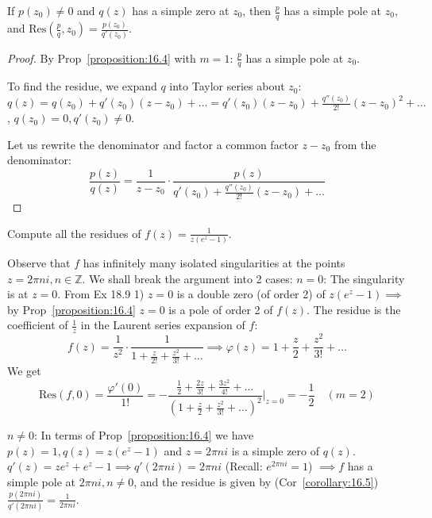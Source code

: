 \begin{corollary}\label{corollary:16.5}
    If $p(z_0) \neq 0$ and $q(z)$ has a simple zero at $z_0$, then $\frac{p}{q}$ has a simple pole at $z_0$, and $\text{Res}(\frac{p}{q}, z_0) = \frac{p(z_0)}{q'(z_0)}$.
\end{corollary}
\begin{proof}    By Prop~\ref{proposition:16.4} with $m = 1$: $\frac{p}{q}$ has a simple pole at $z_0$.
    
    To find the residue, we expand $q$ into Taylor series about $z_0$: $q(z) = q(z_0) + q'(z_0)(z-z_0) + \dots = q'(z_0)(z-z_0) + \frac{q''(z_0)}{2!}(z-z_0)^2 + \dots$, $q(z_0) = 0, q'(z_0) \neq 0$.
    
    Let us rewrite the denominator and factor a common factor $z - z_0$ from the denominator:
    \[  \frac{p(z)}{q(z)} = \frac{1}{z-z_0} \cdot \frac{p(z)}{q'(z_0) + \frac{q''(z_0)}{2!}(z-z_0) + \dots} \]
\end{proof}
\begin{example}\label{example:18.10}
    Compute all the residues of $f(z) = \frac{1}{z(e^z - 1)}$.
\begin{soln}
    Observe that $f$ has infinitely many isolated singularities at the points $z = 2\pi ni, n \in \mathbb{Z}$. We shall break the argument into 2 cases:
    $n = 0$: The singularity is at $z = 0$. From Ex 18.9 1) $z = 0$ is a double zero (of order 2) of $z(e^z - 1) \implies$ by Prop~\ref{proposition:16.4} $z = 0$ is a pole of order 2 of $f(z)$. 
    The residue is the coefficient of $\frac{1}{z}$ in the 
    Laurent series expansion of $f$: \[ f(z) = \frac{1}{z^2} \cdot \frac{1}{1 + \frac{z}{2!} + \frac{z^2}{3!} + \dots} \implies \varphi(z) = 1 + \frac{z}{2} + \frac{z^2}{3!} + \dots\] 
    We get
    \[ \text{Res}(f, 0) = \frac{\varphi'(0)}{1!} = -\frac{\frac{1}{2} + \frac{2z}{3!} + \frac{3z^2}{4!} + \dots}{\left(1 + \frac{z}{2} + \frac{z^2}{3!} + \dots \right)^2}\bigg|_{z=0} = -\frac{1}{2} \quad (m = 2)\]
\end{soln}
\end{example}

$n \neq 0$: In terms of Prop~\ref{proposition:16.4} we have $p(z) = 1, q(z) = z(e^z - 1)$ and $z = 2\pi ni$ is a simple zero of $q(z)$. $q'(z) = ze^z + e^z - 1 \implies q'(2\pi ni) = 2\pi ni$ (Recall: $e^{2\pi ni} = 1$) $\implies f$ has a simple pole at $2\pi ni, n \neq 0$, 
and the residue is given by (Cor~\ref{corollary:16.5}) $\frac{p(2\pi ni)}{q'(2\pi ni)} = \frac{1}{2\pi ni}$.

